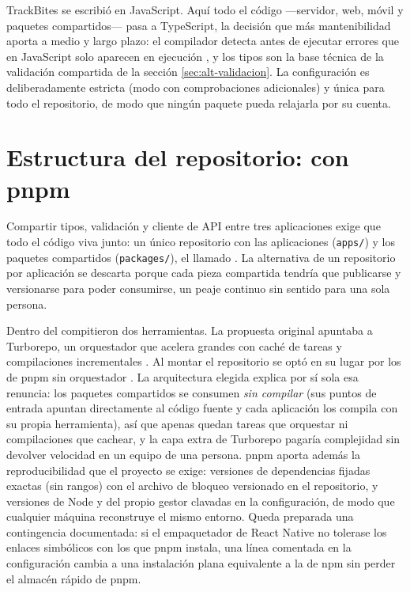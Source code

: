 TrackBites se escribió en JavaScript.
Aquí todo el código —servidor, web, móvil y paquetes compartidos— pasa a TypeScript, la decisión que más mantenibilidad aporta a medio y largo plazo: el compilador detecta antes de ejecutar errores que en JavaScript solo aparecen en ejecución \parencite{typescript-docs}, y los tipos son la base técnica de la validación compartida de la sección \ref{sec:alt-validacion}.
La configuración es deliberadamente estricta (modo  con comprobaciones adicionales) y única para todo el repositorio, de modo que ningún paquete pueda relajarla por su cuenta.

\section{Estructura del repositorio:  con pnpm}
\label{sec:alt-monorepo}

Compartir tipos, validación y cliente de \ac{API} entre tres aplicaciones exige que todo el código viva junto: un único repositorio con las aplicaciones (\texttt{apps/}) y los paquetes compartidos (\texttt{packages/}), el llamado .
La alternativa de un repositorio por aplicación se descarta porque cada pieza compartida tendría que publicarse y versionarse para poder consumirse, un peaje continuo sin sentido para una sola persona.

Dentro del  compitieron dos herramientas.
La propuesta original apuntaba a Turborepo, un orquestador que acelera  grandes con caché de tareas y compilaciones incrementales \parencite{turborepo-docs}.
Al montar el repositorio se optó en su lugar por los  de pnpm sin orquestador \parencite{pnpm-docs}.
La arquitectura elegida explica por sí sola esa renuncia: los paquetes compartidos se consumen \emph{sin compilar} (sus puntos de entrada apuntan directamente al código fuente y cada aplicación los compila con su propia herramienta), así que apenas quedan tareas que orquestar ni compilaciones que cachear, y la capa extra de Turborepo pagaría complejidad sin devolver velocidad en un equipo de una persona.
pnpm aporta además la reproducibilidad que el proyecto se exige: versiones de dependencias fijadas exactas (sin rangos) con el archivo de bloqueo versionado en el repositorio, y versiones de Node y del propio gestor clavadas en la configuración, de modo que cualquier máquina reconstruye el mismo entorno.
Queda preparada una contingencia documentada: si el empaquetador de React Native no tolerase los enlaces simbólicos con los que pnpm instala, una línea comentada en la configuración cambia a una instalación plana equivalente a la de npm sin perder el almacén rápido de pnpm.

